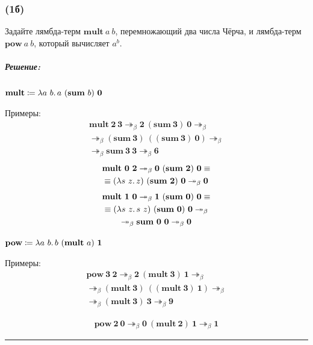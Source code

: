 \documentclass{article}
\newenvironment{proof}{\subparagraph{\hspace{-1em}Решение:\newline}\-}{\par\noindent\rule{\textwidth}{0.4pt}}
\newcommand{\term}[1]{\mathbf{#1}}
\newcommand{\betasteps}{\twoheadrightarrow_\beta}
\begin{document}
    \subsubsection{(1б)}

    Задайте лямбда-терм $\term{mult}~a~b$, перемножающий два числа Чёрча, и лямбда-терм $\term{pow}~a~b$, который вычисляет $a^b$.

    \begin{proof}
        \(\textbf{mult} \coloneqq \lambda a~b\ldotp a~(\term{sum}~b)~\term{0}\)

        Примеры:
        \begin{gather}
            \term{mult}~\term{2}~\term{3} \betasteps \term{2}~(\term{sum}~\term{3})~\term{0} \betasteps \\
            \betasteps (\term{sum}~\term{3})~((\term{sum}~\term{3})~\term{0}) \betasteps \\
            \betasteps \term{sum}~\term{3}~\term{3} \betasteps \term{6}
        \end{gather}
        \begin{gather}
            \term{mult}~\term{0}~\term{2} \betasteps \term{0}~(\term{sum}~\term{2})~\term{0} \equiv \\
            \equiv (\lambda s~z\ldotp z)~(\term{sum}~\term{2})~\term{0} \betasteps \term{0}
        \end{gather}
        \begin{gather}
            \term{mult}~\term{1}~\term{0} \betasteps \term{1}~(\term{sum}~\term{0})~\term{0} \equiv \\
            \equiv (\lambda s~z\ldotp s~z)~(\term{sum}~\term{0})~\term{0} \betasteps \\
            \betasteps \term{sum}~\term{0}~\term{0} \betasteps \term{0}
        \end{gather}

        \(\textbf{pow} \coloneqq \lambda a~b\ldotp b~(\term{mult}~a)~\term{1}\)

        Примеры:
        \begin{gather}
            \term{pow}~\term{3}~\term{2} \betasteps \term{2}~(\term{mult}~\term{3})~\term{1} \betasteps \\
            \betasteps (\term{mult}~\term{3})~((\term{mult}~\term{3})~\term{1}) \betasteps \\
            \betasteps (\term{mult}~\term{3})~\term{3} \betasteps \term{9}
        \end{gather}

        \begin{gather}
            \term{pow}~\term{2}~\term{0} \betasteps \term{0}~(\term{mult}~\term{2})~\term{1} \betasteps \term{1}
        \end{gather}


\end{proof}
\end{document}
